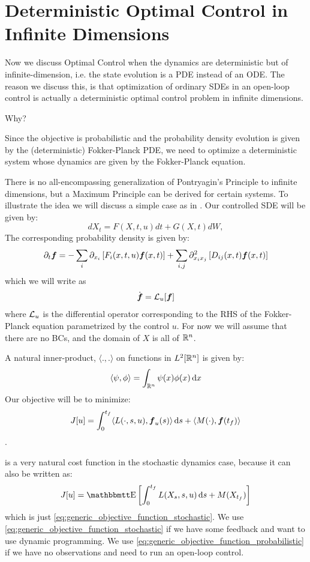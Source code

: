 \documentclass{article}
\begin{document}
\section{Deterministic Optimal Control in Infinite Dimensions}
Now we discuss Optimal Control when the dynamics are deterministic but of
infinite-dimension, i.e. the state evolution is a PDE instead of an ODE.  The
reason we discuss this, is that optimization of ordinary SDEs in an open-loop
control is actually a deterministic optimal control problem in infinite
dimensions.

Why?

Since the objective is probabilistic and the probability density evolution is
given by the (deterministic) Fokker-Planck PDE, we need to optimize a
deterministic system whose dynamics are given by the Fokker-Planck equation.

There is no all-encompassing generalization of Pontryagin's Principle to
infinite dimensions, but a Maximum Principle can be derived for certain systems.
To illustrate the idea we will discuss a simple case as in \cite{Palmer2011}.
Our controlled SDE will be given by: 
$$ dX_t = F(X,t, u) dt + G(X,t) dW, $$
The corresponding probability density is given by: $$ {\partial}_t { \boldsymbol{f} }=
-\sum_i {\partial}_{x_i} \left[ F_i(x,t,u) { \boldsymbol{f} }(x,t) \right] + \sum_{i,j}  {\partial}^2_{x_i
x_j} \left[ D_{ij}(x,t) { \boldsymbol{f} }(x,t) \right] $$ which we will write as $$ \dot{{ \boldsymbol{f} }} =
{ \mathcal{L} }_{u} [{ \boldsymbol{f} }] $$ where ${ \mathcal{L} }_{u}$ is the differential operator corresponding to the
RHS of the Fokker-Planck equation parametrized by the control $u$. For now we
will assume that there are no BCs, and the domain of $X$ is all of ${ \mathbb{R} }^n$.

A natural inner-product, $ \langle.,. \rangle$ on functions in $L^2[{ \mathbb{R} }^n]$ is
given by: $$
 \langle\psi,\phi  \rangle = \int_{{ \mathbb{R} }^n} \psi(x) \phi(x) \, \mathrm{d} x
$$
Our objective will be to minimize:
\begin{equation}
J[u] = \int_0^{ t_f }  \langle L(\cdot,s,u), { \boldsymbol{f} }_u(s) \rangle \, \mathrm{d} s +  
\langle M(\cdot),{ \boldsymbol{f} }({ t_f }) \rangle
\label{eq:generic_objective_function_probabilistic}  
\end{equation}.

 is a very natural cost
function in the stochastic dynamics case, because it can also be written as: 
$$
J[u] = \Exp \left[ \int_0^\tf  L(X_s, s,u) \intd{s} + M(X_\tf) \right] 
$$ which
is just \cref{eq:generic_objective_function_stochastic}. We use
\cref{eq:generic_objective_function_stochastic} if we have some feedback and
want to use dynamic programming. We use
\cref{eq:generic_objective_function_probabilistic} if we have no observations
and need to run an open-loop control.
\end{document}
